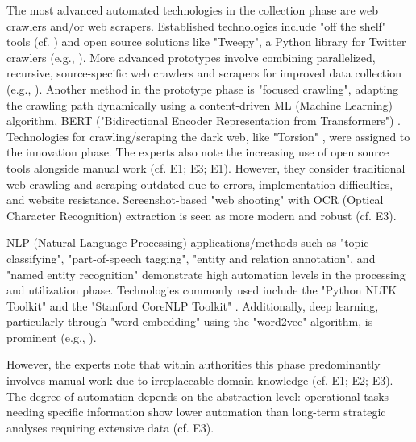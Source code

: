 \documentclass[10pt]{article}
\begin{document}
The most advanced automated technologies in the collection phase are web crawlers and/or web scrapers.
Established technologies include "off the shelf" tools (cf. \cite{Middleton.2020}) and open source
solutions like "Tweepy", a Python library for Twitter crawlers (e.g., \cite{Adewopo.2020}).
More advanced prototypes involve combining parallelized, recursive, source-specific web crawlers and scrapers for improved
data collection (e.g., \cite{Jenkins.2021}). Another method in the prototype phase is
"focused crawling", adapting the crawling path dynamically using a content-driven ML (Machine Learning) algorithm, BERT ("Bidirectional Encoder Representation from Transformers")
\cite{Kuehn.2023}. Technologies for crawling/scraping the dark web, like "Torsion" \cite{Sonawane.2022},
were assigned to the innovation phase. The experts also note the increasing use of open source tools alongside manual work
(cf. E1; E3; E1). However, they consider traditional web crawling and scraping
outdated due to errors, implementation difficulties, and website resistance. Screenshot-based "web shooting" with
OCR (Optical Character Recognition) extraction is seen as more modern and robust (cf. E3).

NLP (Natural Language Processing) applications/methods such as "topic classifying", "part-of-speech tagging", "entity and relation annotation", and "named entity recognition"
demonstrate high automation levels in the processing and utilization phase. Technologies commonly used include
the "Python NLTK Toolkit" \cite{Hubbard.2022} and the "Stanford CoreNLP Toolkit" \cite{Middleton.2020}.
Additionally, deep learning, particularly through "word embedding" using the "word2vec" algorithm, is prominent
(e.g., \cite{Bai.2020}).


However, the experts note that within authorities this phase predominantly involves manual work due to irreplaceable domain knowledge
(cf. E1; E2; E3). The degree of automation depends on the abstraction level:
operational tasks needing specific information show lower automation than long-term strategic analyses requiring
extensive data (cf. E3).
\end{document}
